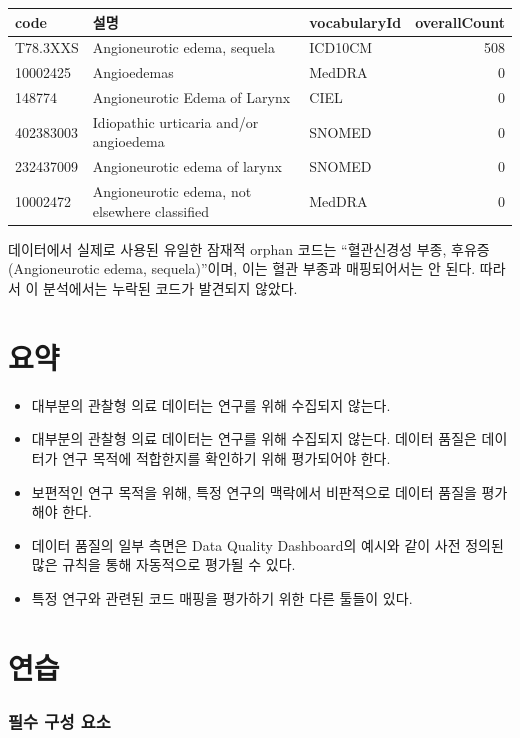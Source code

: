 \documentclass[11pt]{book}
\theoremstyle{definition}
\theoremstyle{definition}
\theoremstyle{definition}
\theoremstyle{remark}
\let\BeginKnitrBlock\begin \let\EndKnitrBlock\end
\begin{document}
\begin{longtable}[]{@{}lllr@{}}
\toprule
code & 설명 & vocabularyId & overallCount\tabularnewline
\midrule
\endhead
T78.3XXS & Angioneurotic edema, sequela & ICD10CM & 508\tabularnewline
10002425 & Angioedemas & MedDRA & 0\tabularnewline
148774 & Angioneurotic Edema of Larynx & CIEL & 0\tabularnewline
402383003 & Idiopathic urticaria and/or angioedema & SNOMED &
0\tabularnewline
232437009 & Angioneurotic edema of larynx & SNOMED & 0\tabularnewline
10002472 & Angioneurotic edema, not elsewhere classified & MedDRA &
0\tabularnewline
\bottomrule
\end{longtable}

데이터에서 실제로 사용된 유일한 잠재적 orphan 코드는 ``혈관신경성 부종,
후유증(Angioneurotic edema, sequela)''이며, 이는 혈관 부종과
매핑되어서는 안 된다. 따라서 이 분석에서는 누락된 코드가 발견되지
않았다.

\section{요약}\label{-13}

\BeginKnitrBlock{rmdsummary}
\begin{itemize}
\item
  대부분의 관찰형 의료 데이터는 연구를 위해 수집되지 않는다.
\item
  대부분의 관찰형 의료 데이터는 연구를 위해 수집되지 않는다. 데이터
  품질은 데이터가 연구 목적에 적합한지를 확인하기 위해 평가되어야 한다.
\item
  보편적인 연구 목적을 위해, 특정 연구의 맥락에서 비판적으로 데이터
  품질을 평가해야 한다.
\item
  데이터 품질의 일부 측면은 Data Quality Dashboard의 예시와 같이 사전
  정의된 많은 규칙을 통해 자동적으로 평가될 수 있다.
\item
  특정 연구와 관련된 코드 매핑을 평가하기 위한 다른 툴들이 있다.
\end{itemize}
\EndKnitrBlock{rmdsummary}

\section{연습}\label{-2}

\subsubsection*{필수 구성 요소}\label{---2}
\end{document}
